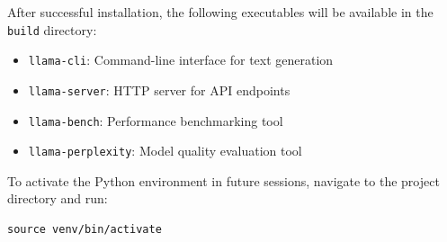 \documentclass[11pt,a4paper]{article}
\begin{document}
After successful installation, the following executables will be available in the \texttt{build} directory:
\begin{itemize}
    \item \texttt{llama-cli}: Command-line interface for text generation
    \item \texttt{llama-server}: HTTP server for API endpoints
    \item \texttt{llama-bench}: Performance benchmarking tool
    \item \texttt{llama-perplexity}: Model quality evaluation tool
\end{itemize}

To activate the Python environment in future sessions, navigate to the project directory and run:
\begin{lstlisting}[style=terminal]
source venv/bin/activate
\end{lstlisting}
\end{document}
